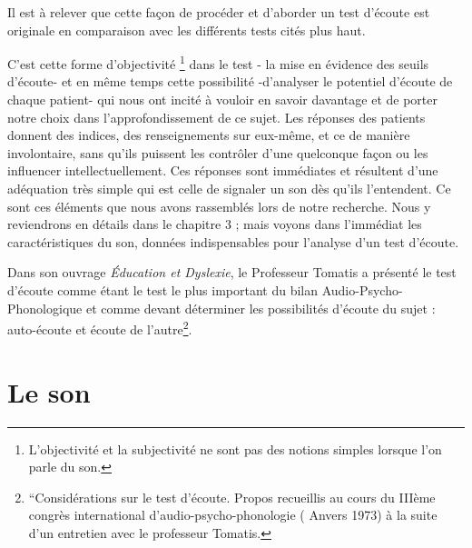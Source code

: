 Il est à relever que cette façon de procéder et d'aborder un test
d'écoute est originale en comparaison avec les différents tests cités
plus haut.

C'est cette forme d'objectivité \footnote{L'objectivité et la
  subjectivité ne sont pas des notions simples lorsque l'on parle du
  son.} dans le test - la mise en évidence des seuils d'écoute- et en
même temps cette possibilité -d'analyser le potentiel d'écoute de
chaque patient- qui nous ont incité à vouloir en savoir davantage et
de porter notre choix dans l'approfondissement de ce sujet. Les
réponses des patients donnent des indices, des renseignements sur
eux-même, et ce de manière involontaire, sans qu'ils puissent les
contrôler d'une quelconque façon ou les influencer
intellectuellement. Ces réponses sont immédiates et résultent d'une
adéquation très simple qui est celle de signaler un son dès qu'ils
l'entendent. Ce sont ces éléments que nous avons rassemblés lors de
notre recherche. Nous y reviendrons en détails dans le chapitre 3 ;
mais voyons dans l'immédiat les caractéristiques du son, données
indispensables pour l'analyse d'un test d'écoute.

 Dans son ouvrage \emph{Éducation et Dyslexie}, le Professeur Tomatis
 a présenté le test d'écoute comme étant le test le plus important du
 bilan Audio-Psycho-Phonologique et comme devant déterminer les
 possibilités d'écoute du sujet : auto-écoute et écoute de
 l'autre\footnote{``Considérations sur le test d'écoute. Propos
   recueillis au cours du IIIème congrès international
   d'audio-psycho-phonologie ( Anvers 1973) à la suite d'un entretien
   avec le professeur Tomatis.}.

\section{Le son}

